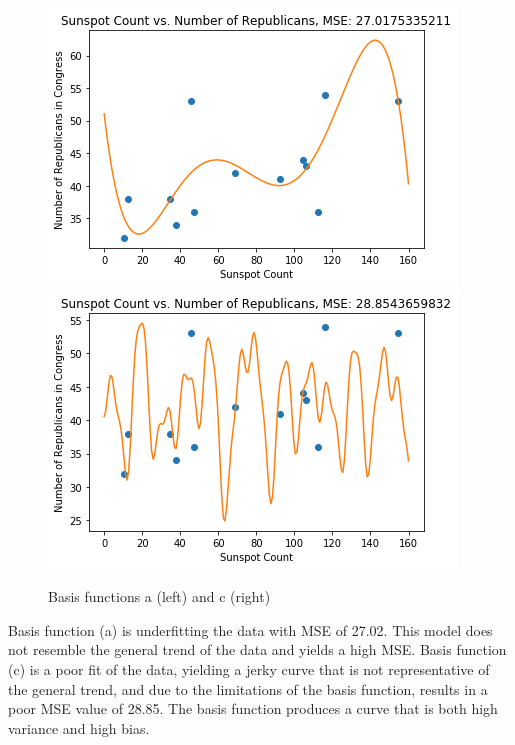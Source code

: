 \documentclass[submit]{harvardml}
\begin{document}
\begin{figure}[!htbp]
\begin{center}
    \includegraphics[scale=.55]{21.png}
    \includegraphics[scale=.55]{23.png}
    \caption{Basis functions a (left) and c (right)}
\end{center}
\end{figure}

Basis function (a) is underfitting the data with MSE of 27.02. This model does not resemble the general trend of the data and yields a high MSE. Basis function (c) is a poor fit of the data, yielding a jerky curve that is not representative of the general trend, and due to the limitations of the basis function, results in a poor MSE value of 28.85. The basis function produces a curve that is both high variance and high bias.
\end{document}
